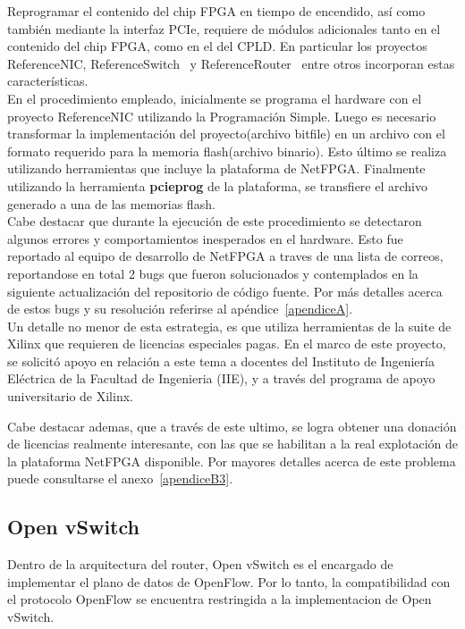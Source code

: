 Reprogramar el contenido del chip FPGA en tiempo de encendido, así como también mediante la interfaz PCIe, requiere de módulos adicionales tanto en el contenido del chip FPGA, como en el del CPLD. En particular los proyectos ReferenceNIC, ReferenceSwitch~\citep{ReferenceSwitchProject} y ReferenceRouter~\citep{ReferenceRouterProject} entre otros incorporan estas características.\\

En el procedimiento empleado, inicialmente se programa el hardware con el proyecto ReferenceNIC utilizando la Programaci\'on Simple. Luego es necesario transformar la implementaci\'on del proyecto(archivo bitfile) en un archivo con el formato requerido para la memoria flash(archivo binario). Esto \'ultimo se realiza utilizando herramientas que incluye la plataforma de NetFPGA. Finalmente utilizando la herramienta \textbf{pcieprog} de la plataforma, se transfiere el archivo generado a una de las memorias flash.\\

Cabe destacar que durante la ejecuci\'on de este procedimiento se detectaron algunos errores y comportamientos inesperados en el hardware. Esto fue reportado al equipo de desarrollo de NetFPGA a traves de una lista de correos, reportandose en total 2 bugs que fueron solucionados y contemplados en la siguiente actualizaci\'on del repositorio de c\'odigo fuente. Por m\'as detalles acerca de estos bugs y su resoluci\'on referirse al ap\'endice~\ref{apendiceA}.\\

Un detalle no menor de esta estrategia, es que utiliza herramientas de la suite de Xilinx que requieren de licencias especiales pagas. En el marco de este proyecto, se solicit\'o apoyo en relaci\'on a este tema a docentes del Instituto de Ingeniería Eléctrica de la Facultad de Ingenieria (IIE), y a través del programa de apoyo universitario de Xilinx. 

Cabe destacar ademas, que a través de este ultimo, se logra obtener una donación de licencias realmente interesante, con las que se habilitan a la real explotación de la plataforma NetFPGA disponible. Por mayores detalles acerca de este problema puede consultarse el anexo~\ref{apendiceB3}.

\subsection{Open vSwitch}
Dentro de la arquitectura del router, Open vSwitch es el encargado de implementar el plano de datos de OpenFlow. Por lo tanto, la compatibilidad con el protocolo OpenFlow se encuentra restringida a la implementacion de Open vSwitch.\\

